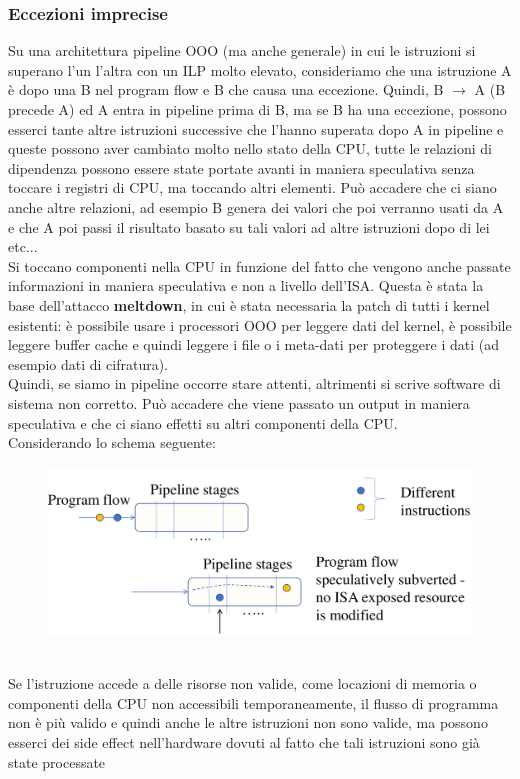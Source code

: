 \documentclass[12pt, oneside]{extbook}
\begin{document}
\subsubsection{Eccezioni imprecise}
Su una architettura pipeline OOO (ma anche generale) in cui le istruzioni si superano l'un l'altra con un ILP molto elevato, consideriamo che una istruzione A è dopo una B nel program flow e B che causa una eccezione. Quindi, B $\rightarrow$ A (B precede A) ed A entra in pipeline prima di B, ma se B ha una eccezione, possono esserci tante altre istruzioni successive che l'hanno superata dopo A in pipeline e queste possono aver cambiato molto nello stato della CPU, tutte le relazioni di dipendenza possono essere state portate avanti in maniera speculativa senza toccare i registri di CPU, ma toccando altri elementi. Può accadere che ci siano anche altre relazioni, ad esempio B genera dei valori che poi verranno usati da A e che A poi passi il risultato basato su tali valori ad altre istruzioni dopo di lei etc... \\ Si toccano componenti nella CPU in funzione del fatto che vengono anche passate informazioni in maniera speculativa e non a livello dell'ISA. Questa è stata la base dell'attacco \textbf{meltdown}, in cui è stata necessaria la patch di tutti i kernel esistenti: è possibile usare i processori OOO per leggere dati del kernel, è possibile leggere buffer cache e quindi leggere i file o i meta-dati per proteggere i dati (ad esempio dati di cifratura).
\\ Quindi, se siamo in pipeline occorre stare attenti, altrimenti si scrive software di sistema non corretto. Può accadere che viene passato un output in maniera speculativa e che ci siano effetti su altri componenti della CPU. \\ Considerando lo schema seguente:
\begin{figure}[!h]
\includegraphics[scale=0.15]{immagini/not_valid_instr}
\end{figure}
\\Se l'istruzione accede a delle risorse non valide, come locazioni di memoria o componenti della CPU non accessibili temporaneamente, il flusso di programma non è più valido e quindi anche le altre istruzioni non sono valide, ma possono esserci dei side effect nell'hardware dovuti al fatto che tali istruzioni sono già state processate
\end{document}
